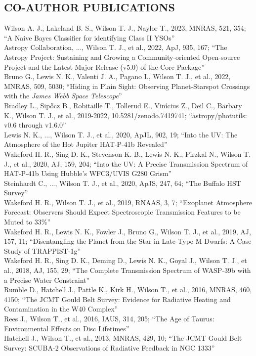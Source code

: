 \documentclass[letter, margin, 10pt]{res} %
\begin{document}
\begin{resume}
\section{CO-AUTHOR PUBLICATIONS}
Wilson A. J., Lakeland B. S., Wilson T. J., Naylor T., 2023, MNRAS, 521, 354; ``A Naive Bayes Classifier for identifying Class II YSOs''\\
Astropy Collaboration, ..., Wilson T. J., et al., 2022, ApJ, 935, 167; ``The Astropy Project: Sustaining and Growing a Community-oriented Open-source Project and the Latest Major Release (v5.0) of the Core Package''\\
Bruno G., Lewis N. K., Valenti J. A., Pagano I., Wilson T. J., et al., 2022, MNRAS, 509, 5030; ``Hiding in Plain Sight: Observing Planet-Starspot Crossings with the \textit{James Webb Space Telescope}''\\
Bradley L., Sip\H{o}cz B., Robitaille T., Tollerud E., Vinícius Z., Deil C., Barbary K., Wilson T. J., et al., 2019-2022, 10.5281/zenodo.7419741; ``astropy/photutils: v0.6 through v1.6.0''\vspace{2pt}\\
Lewis N. K., ..., Wilson T. J., et al., 2020, ApJL, 902, 19; ``Into the UV: The Atmosphere of the Hot Jupiter HAT-P-41b Revealed''\vspace{2pt}\\
Wakeford H. R., Sing D. K., Stevenson K. B., Lewis N. K., Pirzkal N., Wilson T. J., et al., 2020, AJ, 159, 204; ``Into the UV: A Precise Transmission Spectrum of HAT-P-41b Using Hubble's WFC3/UVIS G280 Grism''\vspace{2pt}\\
Steinhardt C., ..., Wilson T. J., et al., 2020, ApJS, 247, 64; ``The Buffalo HST Survey''\vspace{2pt}\\
Wakeford H. R., Wilson T. J., et al., 2019, RNAAS, 3, 7; ``Exoplanet Atmosphere Forecast: Observers Should Expect Spectroscopic Transmission Features to be Muted to 33\%''\vspace{2pt}\\
Wakeford H. R., Lewis N. K., Fowler J., Bruno G., Wilson T. J., et al., 2019, AJ, 157, 11; ``Disentangling the Planet from the Star in Late-Type M Dwarfs: A Case Study of TRAPPIST-1g''\vspace{2pt}\\
Wakeford H. R., Sing D. K., Deming D., Lewis N. K., Goyal J., Wilson T. J., et al., 2018, AJ, 155, 29; ``The Complete Transmission Spectrum of WASP-39b with a Precise Water Constraint''\vspace{2pt}\\
Rumble D., Hatchell J., Pattle K., Kirk H., Wilson T., et al., 2016, MNRAS, 460, 4150; ``The JCMT Gould Belt Survey: Evidence for Radiative Heating and Contamination in the W40 Complex''\vspace{2pt}\\
Rees J., Wilson T., et al., 2016, IAUS, 314, 205; ``The Age of Taurus: Environmental Effects on Disc Lifetimes''\vspace{2pt}\\
Hatchell J., Wilson T., et al., 2013, MNRAS, 429, 10; ``The JCMT Gould Belt Survey: SCUBA-2 Observations of Radiative Feedback in NGC 1333''


\end{resume}
\end{document}
